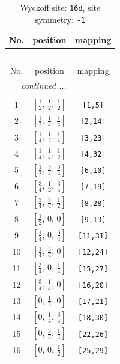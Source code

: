 \documentclass[fleqn,8pt]{jsarticle}
\begin{document}
\renewcommand{\arraystretch}{1.2}
\begin{longtable}{ccc}
\caption{Wyckoff site: {\tt 16d}, site symmetry: {\tt -1}}
 \\
 \hline \hline
No. & position & mapping \\ \hline \endfirsthead

\multicolumn{2}{l}{\tablename\ \thetable{}} \\
 \hline \hline
No. & position & mapping \\ \hline \endhead

 \hline \hline
\multicolumn{2}{r}{\footnotesize\it continued ...} \\ \endfoot

 \hline \hline
\multicolumn{2}{r}{} \\ \endlastfoot

1 & $\left[ \frac{1}{2},\, \frac{1}{2},\, \frac{1}{2} \right]$ & {\tt [1,5]} \\ \hline
2 & $\left[ \frac{1}{2},\, \frac{1}{4},\, \frac{1}{4} \right]$ & {\tt [2,14]} \\ \hline
3 & $\left[ \frac{1}{4},\, \frac{1}{2},\, \frac{1}{4} \right]$ & {\tt [3,23]} \\ \hline
4 & $\left[ \frac{1}{4},\, \frac{1}{4},\, \frac{1}{2} \right]$ & {\tt [4,32]} \\ \hline
5 & $\left[ \frac{1}{2},\, \frac{3}{4},\, \frac{3}{4} \right]$ & {\tt [6,10]} \\ \hline
6 & $\left[ \frac{3}{4},\, \frac{1}{2},\, \frac{3}{4} \right]$ & {\tt [7,19]} \\ \hline
7 & $\left[ \frac{3}{4},\, \frac{3}{4},\, \frac{1}{2} \right]$ & {\tt [8,28]} \\ \hline
8 & $\left[ \frac{1}{2},\, 0,\, 0 \right]$ & {\tt [9,13]} \\ \hline
9 & $\left[ \frac{1}{4},\, 0,\, \frac{3}{4} \right]$ & {\tt [11,31]} \\ \hline
10 & $\left[ \frac{1}{4},\, \frac{3}{4},\, 0 \right]$ & {\tt [12,24]} \\ \hline
11 & $\left[ \frac{3}{4},\, 0,\, \frac{1}{4} \right]$ & {\tt [15,27]} \\ \hline
12 & $\left[ \frac{3}{4},\, \frac{1}{4},\, 0 \right]$ & {\tt [16,20]} \\ \hline
13 & $\left[ 0,\, \frac{1}{2},\, 0 \right]$ & {\tt [17,21]} \\ \hline
14 & $\left[ 0,\, \frac{1}{4},\, \frac{3}{4} \right]$ & {\tt [18,30]} \\ \hline
15 & $\left[ 0,\, \frac{3}{4},\, \frac{1}{4} \right]$ & {\tt [22,26]} \\ \hline
16 & $\left[ 0,\, 0,\, \frac{1}{2} \right]$ & {\tt [25,29]} \\
\end{longtable}
\end{document}

